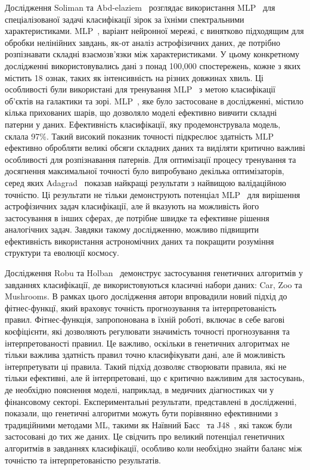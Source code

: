 Дослідження Soliman та Abd-elaziem~\cite{ct14} розглядає використання MLP~\cite{ct26} для спеціалізованої задачі класифікації зірок за їхніми спектральними характеристиками. MLP~\cite{ct26}, варіант нейронної мережі, є винятково підходящим для обробки нелінійних завдань, як-от аналіз астрофізичних даних, де потрібно розпізнавати складні взаємозв'язки між характеристиками. У цьому конкретному дослідженні використовувались дані з понад 100,000 спостережень, кожне з яких містить 18 ознак, таких як інтенсивність на різних довжинах хвиль. Ці особливості були використані для тренування MLP~\cite{ct26} з метою класифікації об'єктів на галактики та зорі. MLP~\cite{ct26}, яке було застосоване в дослідженні, містило кілька прихованих шарів, що дозволяло моделі ефективно вивчити складні патерни у даних. Ефективність класифікації, яку продемонструвала модель, склала 97$\%$. Такий високий показник точності підкреслює здатність MLP~\cite{ct26} ефективно обробляти великі обсяги складних даних та виділяти критично важливі особливості для розпізнавання патернів. Для оптимізації процесу тренування та досягнення максимальної точності було випробувано декілька оптимізаторів, серед яких Adagrad~\cite{ct29} показав найкращі результати з найвищою валідаційною точністю. Ці результати не тільки демонструють потенціал MLP~\cite{ct26} для вирішення астрофізичних задач класифікації, але й вказують на можливість його застосування в інших сферах, де потрібне швидке та ефективне рішення аналогічних задач. Завдяки такому дослідженню, можливо підвищити ефективність використання астрономічних даних та покращити розуміння структури та еволюції космосу.

Дослідження Robu та Holban~\cite{ct15} демонструє застосування генетичних алгоритмів у завданнях класифікації, де використовуються класичні набори даних: Car, Zoo та Mushrooms. В рамках цього дослідження автори впровадили новий підхід до фітнес-функцї, який враховує точність прогнозування та інтерпретованість правил. Фітнес-функція, запропонована в їхній роботі, включає в себе вагові коєфіцієнти, які дозволяють регулювати значимість точності прогнозування та інтерпретованості правиил. Це важливо, оскільки в генетичних алгоритмах не тільки важлива здатність правил точно класифікувати дані, але й можливість інтерпретувати ці правила. Такий підхід дозволяє створювати правила, які не тільки ефективні, але й інтерпретовані, що є критично важливим для застосувань, де необхідно пояснення моделі, наприклад, в медичних діагностиках чи у фінансовому секторі. Експериментальні результати, представлені в дослідженні, показали, що генетичні алгоритми можуть бути порівнянно ефективними з традиційними методами ML, такими як Наївний Баєс~\cite{ct16} та J48~\cite{ct17}, які також були застосовані до тих же даних. Це свідчить про великий потенціал генетичних алгоритмів в завданнях класифікації, особливо коли необхідно знайти баланс між точністю та інтерпретованістю результатів.

